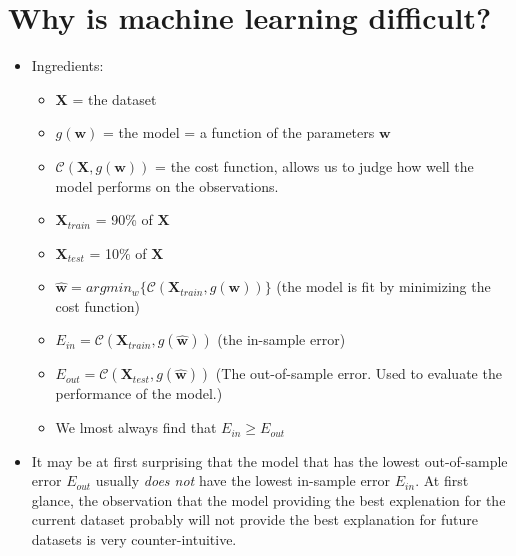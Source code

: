 \documentclass[norsk,a4paper,11pt]{article}
\begin{document}
\section{Why is machine learning difficult?}
	\begin{itemize}
		\item Ingredients:
		\begin{itemize}
			\item $\mathbf{X}$ = the dataset
			\item $g(\mathbf{w})$ = the model = a function of the parameters $\mathbf{w}$
			\item $\mathcal{C}(\mathbf{X}, g(\mathbf{w}))$ = the cost function, allows us to judge how well the model performs on the observations.
			\item $\mathbf{X}_{train}$ = 90\% of $\mathbf{X}$
			\item $\mathbf{X}_{test}$ = 10\% of $\mathbf{X}$
			\item $\hat{\mathbf{w}} = argmin_{w}\{ \mathcal{C}(\mathbf{X}_{train}, g(\mathbf{w})) \}$ (the model is fit by minimizing the cost function)
			\item $E_{in} = \mathcal{C}(\mathbf{X}_{train}, g(\hat{\mathbf{w}}))$ (the in-sample error)
			\item $E_{out} = \mathcal{C}(\mathbf{X}_{test}, g(\hat{\mathbf{w}}))$ (The out-of-sample error. Used to evaluate the performance of the model.)
			\item We lmost always find that $E_{in} \geq E_{out}$
		\end{itemize}
		\item It may be at first surprising that the model that has the lowest out-of-sample error $E_{out}$ usually \textit{does not} have the lowest in-sample error $E_{in}$. At first glance, the observation that the model providing the best explenation for the current dataset probably will not provide the best explanation for future datasets is very counter-intuitive.


\end{itemize}
\end{document}
